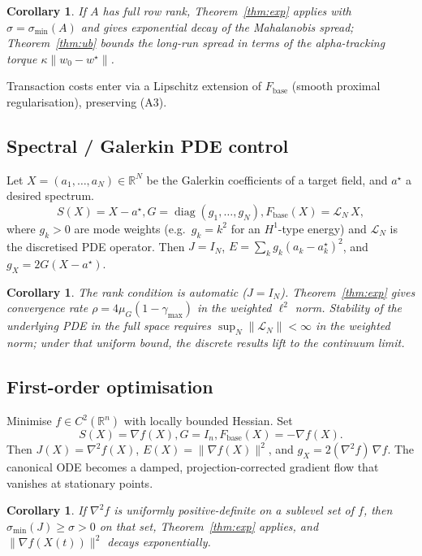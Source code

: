 \documentclass[11pt,oneside]{amsart}
\def\qquad{ }%
\theoremstyle{plain}
\newtheorem{corollary}[theorem]{Corollary}
\theoremstyle{definition}
\newcommand{\gX}{g_X}
\newcommand{\Fbase}{F_{\mathrm{base}}}
\newcommand{\R}{\mathbb{R}}
\DeclareMathOperator{\diag}{diag}
\begin{document}
\begin{corollary}
If $A$ has full row rank, Theorem~\ref{thm:exp} applies with
$\sigma = \sigma_{\min}(A)$ and gives exponential decay of the
Mahalanobis spread; Theorem~\ref{thm:ub} bounds the long-run spread
in terms of the alpha-tracking torque $\kappa\|w_{0}-w^{\star}\|$.
\end{corollary}

Transaction costs enter via a Lipschitz extension of $\Fbase$ (smooth
proximal regularisation), preserving (A3).

\subsection{Spectral / Galerkin PDE control}
\label{sec:app-pde}

Let $X = (a_{1},\dots,a_{N}) \in \R^{N}$ be the Galerkin coefficients
of a target field, and $a^{\star}$ a desired spectrum.
\[
  S(X) = X - a^{\star},\qquad
  G = \diag(g_{1},\dots,g_{N}),\qquad
  \Fbase(X) = \mathcal{L}_{N}\,X,
\]
where $g_{k}>0$ are mode weights (e.g.\ $g_{k}=k^{2}$ for an $H^{1}$-type
energy) and $\mathcal{L}_{N}$ is the discretised PDE operator.
Then $J = I_{N}$, $E = \sum_{k} g_{k}(a_{k}-a^{\star}_{k})^{2}$, and
$\gX = 2G(X-a^{\star})$.

\begin{corollary}
The rank condition is automatic ($J=I_{N}$). Theorem~\ref{thm:exp}
gives convergence rate $\rho = 4\mu_{G}(1-\gamma_{\max})$ in the
weighted $\ell^{2}$ norm. Stability of the underlying PDE in the
full space requires $\sup_{N}\|\mathcal{L}_{N}\|<\infty$ in the
weighted norm; under that uniform bound, the discrete results lift to
the continuum limit.
\end{corollary}

\subsection{First-order optimisation}
\label{sec:app-opt}

Minimise $f \in C^{2}(\R^{n})$ with locally bounded Hessian. Set
\[
  S(X) = \nabla f(X),\qquad
  G = I_{n},\qquad
  \Fbase(X) = -\nabla f(X).
\]
Then $J(X) = \nabla^{2} f(X)$, $E(X) = \|\nabla f(X)\|^{2}$, and
$\gX = 2(\nabla^{2} f)\,\nabla f$. The canonical ODE becomes a
damped, projection-corrected gradient flow that vanishes at
stationary points.

\begin{corollary}
If $\nabla^{2} f$ is uniformly positive-definite on a sublevel set
of $f$, then $\sigma_{\min}(J)\ge\sigma>0$ on that set,
Theorem~\ref{thm:exp} applies, and $\|\nabla f(X(t))\|^{2}$ decays
exponentially.
\end{corollary}
\end{document}
